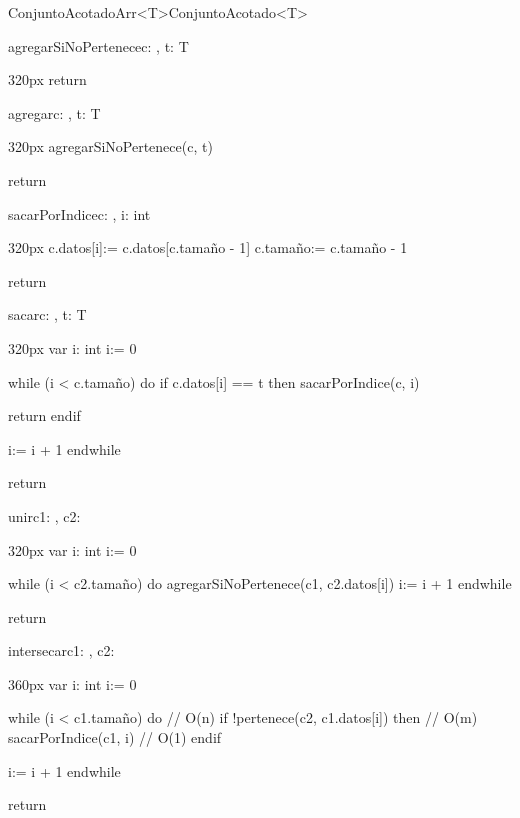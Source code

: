 \documentclass[10pt,a4paper]{article}
\begin{document}
\begin{ModuloImplements}{ConjuntoAcotadoArr<T>}{ConjuntoAcotado<T>}
\begin{proc}{agregarSiNoPertenece}{\Inout c: , \In t: T}{}
\begin{ImplementationCode}{320px}
      return
    \end{ImplementationCode}
  \end{proc}
  \begin{proc}{agregar}{\Inout c: , \In t: T}{}
    \begin{ImplementationCode}{320px}
      agregarSiNoPertenece(c, t)
      
      return
    \end{ImplementationCode}
  \end{proc}
  \begin{proc}{sacarPorIndice}{\Inout c: , \In i: int}{}
    \begin{ImplementationCode}{320px}
      c.datos[i]:= c.datos[c.tamaño - 1]
      c.tamaño:= c.tamaño - 1

      return
    \end{ImplementationCode}
  \end{proc}
  \begin{proc}{sacar}{\Inout c: , \In t: T}{}
    \begin{ImplementationCode}{320px}
      var i: int
          i:= 0

      while (i < c.tamaño) do
        if c.datos[i] == t then
          sacarPorIndice(c, i)

          return
        endif

        i:= i + 1
      endwhile

      return
    \end{ImplementationCode}
  \end{proc}
  \begin{proc}{unir}{\Inout c1: , \In c2: }{}
    \begin{ImplementationCode}{320px}
      var i: int
          i:= 0

      while (i < c2.tamaño) do
        agregarSiNoPertenece(c1, c2.datos[i])
        i:= i + 1
      endwhile

      return
    \end{ImplementationCode}
  \end{proc}
  \begin{proc}{intersecar}{\Inout c1: , \In c2: }{}
    \begin{ImplementationCode}{360px}
      var i: int
          i:= 0

      while (i < c1.tamaño) do              // O(n)
        if !pertenece(c2, c1.datos[i]) then // O(m)
          sacarPorIndice(c1, i)             // O(1)
        endif

        i:= i + 1
      endwhile

      return
    \end{ImplementationCode}
  \end{proc}
\end{ModuloImplements}
\end{document}
